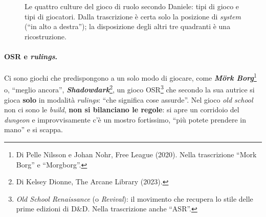 \begin{figure}[htbp]
\centering
{}
\caption{Le quattro culture del gioco di ruolo secondo Daniele: tipi di gioco e tipi di giocatori.
Dalla trascrizione è certa solo la posizione di \emph{system} (``in alto a destra''); la
disposizione degli altri tre quadranti è una ricostruzione.}
\label{a16:fig:culture}
\end{figure}

\paragraph{OSR e \emph{rulings}.} Ci sono giochi che predispongono a un solo modo di giocare, come
\textbf{\emph{Mörk Borg}}\footnote{Di Pelle Nilsson e Johan Nohr, Free League (2020). Nella
trascrizione ``Mork Borg'' e ``Morgborg''.} o, ``meglio ancora'', \textbf{\emph{Shadowdark}}\footnote{Di
Kelsey Dionne, The Arcane Library (2023).}, un gioco OSR\footnote{\emph{Old School Renaissance} (o
\emph{Revival}): il movimento che recupera lo stile delle prime edizioni di D\&D. Nella
trascrizione anche ``ASR''.} che secondo la sua autrice si gioca \textbf{solo} in modalità
\emph{rulings}: ``che significa cose assurde''. Nel gioco \emph{old school} non ci sono le
\emph{build}, \textbf{non si bilanciano le regole}: si apre un corridoio del \emph{dungeon} e
improvvisamente c'è un mostro fortissimo, ``più potete prendere in mano'' e si scappa.

